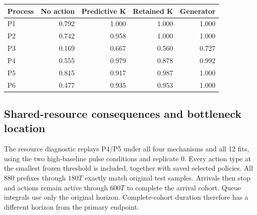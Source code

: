 \begin{center}\small\begin{tabular}{lrrrr}\toprule

Process & No action & Predictive K & Retained K & Generator\\\midrule

P1 & 0.792 & 1.000 & 1.000 & 1.000\\

P2 & 0.742 & 0.958 & 1.000 & 1.000\\

P3 & 0.169 & 0.667 & 0.560 & 0.727\\

P4 & 0.555 & 0.979 & 0.878 & 0.992\\

P5 & 0.815 & 0.917 & 0.987 & 1.000\\

P6 & 0.477 & 0.935 & 0.953 & 1.000\\

\bottomrule\end{tabular}\end{center}

\subsection{Shared-resource consequences and bottleneck location}

The resource diagnostic replays P4/P5 under all four mechanisms and all 12 fits, using the two high-baseline pulse conditions and replicate 0. Every action type at the smallest frozen threshold is included, together with saved selected policies. All 880 prefixes through $180T$ exactly match original test samples. Arrivals then stop and actions remain active through $600T$ to complete the arrival cohort. Queue integrals use only the original horizon. Complete-cohort duration therefore has a different horizon from the primary endpoint.

